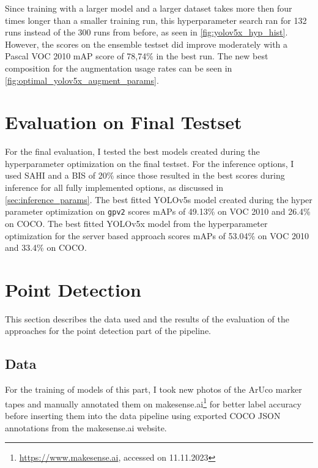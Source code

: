 \documentclass[10pt]{book}
\begin{document}
Since training with a larger model and a larger dataset takes more then four times longer than a smaller training run, this hyperparameter search ran for 132 runs instead of the 300 runs from before, as seen in \autoref{fig:yolov5x_hyp_hist}. However, the scores on the ensemble testset did improve moderately with a Pascal VOC 2010 mAP score of 78,74\% in the best run. The new best composition for the augmentation usage rates can be seen in \autoref{fig:optimal_yolov5x_augment_params}.

\section{Evaluation on Final Testset}
\label{sec:final_eval}

For the final evaluation, I tested the best models created during the hyperparameter optimization on the final testset. For the inference options, I used \ac{SAHI} and a \ac{BIS} of 20\% since those resulted in the best scores during inference for all fully implemented options, as discussed in \autoref{sec:inference_params}.
The best fitted \ac{YOLO}v5s model created during the hyper parameter optimization on \texttt{gpv2} scores \acp{mAP} of 49.13\% on VOC 2010 and 26.4\% on COCO. The best fitted \ac{YOLO}v5x model from the hyperparameter optimization for the server based approach scores \acp{mAP} of 53.04\% on VOC 2010 and 33.4\% on COCO.

\section{Point Detection}

This section describes the data used and the results of the evaluation of the approaches for the point detection part of the pipeline.

\subsection{Data}

For the training of models of this part, I took new photos of the \ac{ArUco} marker tapes and manually annotated them on makesense.ai\footnote{\url{https://www.makesense.ai}, accessed on 11.11.2023} for better label accuracy before inserting them into the data pipeline using exported \ac{COCO} \ac{JSON} annotations from the makesense.ai website.
\end{document}
